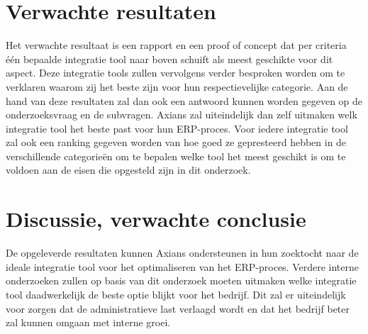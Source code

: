 \section{Verwachte resultaten}
\label{sec:Verwachte resultaten}

Het verwachte resultaat is een rapport en een proof of concept dat per criteria één bepaalde integratie tool naar boven schuift als meest geschikte voor dit aspect. Deze integratie tools zullen vervolgens verder besproken worden om te verklaren waarom zij het beste zijn voor hun respectievelijke categorie. Aan de hand van deze resultaten zal dan ook een antwoord kunnen worden gegeven op de onderzoeksvraag en de subvragen. Axians zal uiteindelijk dan zelf uitmaken welk integratie tool het beste past voor hun ERP-proces. Voor iedere integratie tool zal ook een ranking gegeven worden van hoe goed ze gepresteerd hebben in de verschillende categorieën om te bepalen welke tool het meest geschikt is om te voldoen aan de eisen die opgesteld zijn in dit onderzoek.

\section{Discussie, verwachte conclusie}
\label{sec:discussie-conclusie}

De opgeleverde resultaten kunnen Axians ondersteunen in hun zoektocht naar de ideale integratie tool voor het optimaliseren van het ERP-proces. Verdere interne onderzoeken zullen op basis van dit onderzoek moeten uitmaken welke integratie tool daadwerkelijk de beste optie blijkt voor het bedrijf. Dit zal er uiteindelijk voor zorgen dat de administratieve last verlaagd wordt en dat het bedrijf beter zal kunnen omgaan met interne groei.

